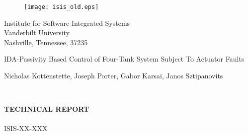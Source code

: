 \begin{figure}[!htp]
\label{fig:ISIS} \vspace{1cm}
\begin{center}
\texttt{[image: isis\_old.eps]}
\end{center}
\vspace{.0cm}
\end{figure}

\begin{center}\begin{Large}
Institute for Software Integrated Systems \\
Vanderbilt University \\
Nashville, Tennessee, 37235 \\
\end{Large}\end{center}

\vspace{1cm}

\begin{LARGE}
\begin{center}
IDA-Passivity Based Control of Four-Tank System Subject To Actuator
Faults \\
\vspace{.75cm}
\begin{Large}
Nicholas Kottenstette, Joseph Porter, Gabor Karsai, Janos Sztipanovits
\end{Large}\\
\end{center}
\end{LARGE}

\vspace{2cm}

\begin{Large}
\begin{center}
\textbf{TECHNICAL REPORT} \\
\ \\
ISIS-XX-XXX
\end{center}
\end{Large}

\newpage
